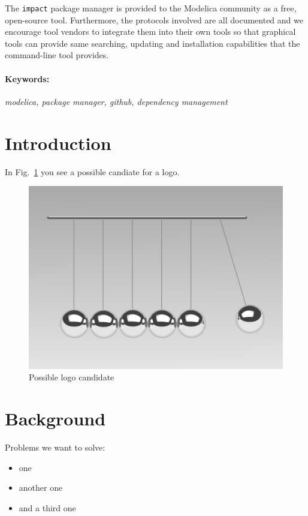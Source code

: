 \documentclass[11pt,a4paper,twocolumn]{article}
\newcommand{\code}[1]{\texttt{#1}} %
\begin{document}
The \code{impact} package manager is provided to the Modelica community
as a free, open-source tool.  Furthermore, the protocols involved are
all documented and we encourage tool vendors to integrate them into
their own tools so that graphical tools can provide same searching,
updating and installation capabilities that the command-line tool
provides.

\paragraph{Keywords:}\emph{modelica, package manager, github, dependency management}

\section{Introduction}
\label{sec:intro}
In Fig.~\ref{fig:newtons_cradle} you see a possible candiate for a logo.


\begin{figure}[!ht]
  \centering
  \includegraphics[width=\columnwidth]{newtons_cradle}
  \caption{Possible logo candidate \cite{Andersson2007}}
  \label{fig:newtons_cradle}
\end{figure}


\section{Background}
\label{sec:background}

Problems we want to solve:
\begin{itemize}
\item one
\item another one
\item and a third one
\end{itemize}
\end{document}
